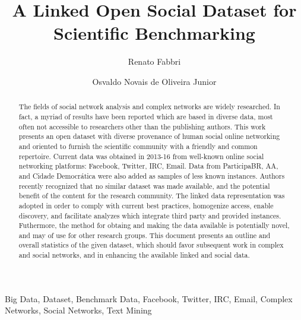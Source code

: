 \documentclass[review]{elsarticle}
\begin{document}
%
\begin{frontmatter}
%
\title{A Linked Open Social Dataset for Scientific Benchmarking}
%
\author[pws]{Renato Fabbri}
%
\author[pwr]{Osvaldo Novais de Oliveira Junior}
%
  \address[pws]{Institute of Mathematics and Computer Sciences, University of São Paulo (ICMC/USP), Brazil}
\address[pwr]{S\~ao Carlos Institute of Physics, University of  São Paulo
(IFSC-USP), Brazil}
%
\begin{abstract}
The fields of social network analysis and complex networks
are widely researched.
In fact, a myriad of results have been reported which are based in
diverse data, most often not accessible to researchers other than the publishing authors.
This work presents an open dataset with diverse provenance of 
human social online networking 
  and oriented
to furnish the scientific community with a friendly and common repertoire.
Current data was obtained in 2013-16 from well-known online social networking platforms:
Facebook, Twitter, IRC, Email.
Data from ParticipaBR, AA, and Cidade Democrática were also added as samples of
less known instances.
Authors recently recognized that no similar dataset was made available,
and the potential benefit of the content for the research community.
The linked data representation was adopted in order to
comply with current best practices, homogenize access, enable discovery,
and facilitate analyzes which integrate third
party and provided instances.
Futhermore, the method for obtaing and making the data available is potentially novel, and may of use for other research groups.
This document presents an outline and overall statistics of the given
dataset, which should favor subsequent work in complex and social networks,
  and in enhancing the available linked and social data.
\end{abstract}
%
\begin{keyword}
Big Data, Dataset, Benchmark Data, Facebook, Twitter, IRC, Email,
Complex Networks, Social Networks, Text Mining
\end{keyword}

\end{frontmatter}
\end{document}

